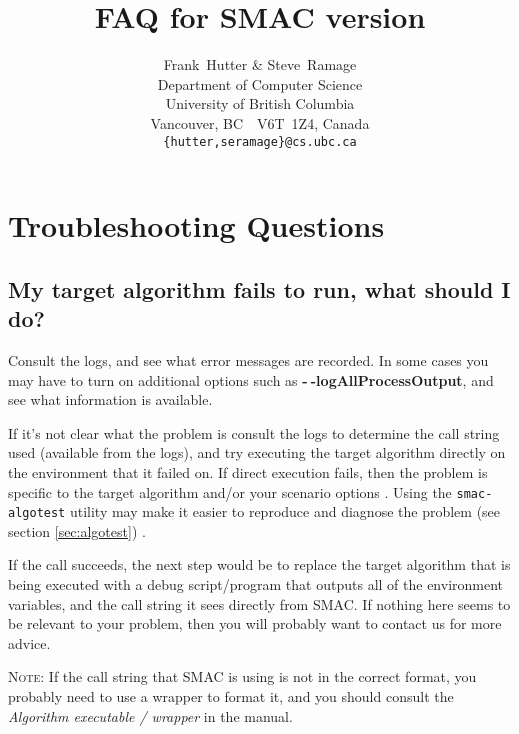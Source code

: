 \documentclass[11pt,letterpaper,oneside]{article}
\begin{document}
\title{FAQ for SMAC version }

\author{
Frank~Hutter \& Steve~Ramage\\
Department of Computer Science\\
University of British Columbia\\
Vancouver, BC\ \ V6T~1Z4, Canada\\
\texttt{\{hutter,seramage\}@cs.ubc.ca}
}



\maketitle


\renewcommand*\contentsname{FAQ}
\tableofcontents

\section{Troubleshooting Questions}


\subsection{My target algorithm fails to run, what should I do?}

Consult the logs, and see what error messages are recorded. In some cases you may have to turn on additional options such as \textbf{-$~\!$-logAllProcessOutput}, and see what information is available.

If it's not clear what the problem is consult the logs to determine the call string used (available from the logs), and try executing the target algorithm directly on the environment that it failed on. If direct execution fails, then the problem is specific to the target algorithm and/or your scenario options . Using the \texttt{smac-algotest} utility may make it easier to reproduce and diagnose the problem (see section \ref{sec:algotest}) .

If the call succeeds, the next step would be to replace the target algorithm that is being executed with a debug script/program that outputs all of the environment variables, and the call string it sees directly from SMAC. If nothing here seems to be relevant to your problem, then you will probably want to contact us for more advice.

\textsc{Note:} If the call string that SMAC is using is not in the correct format, you probably need to use a wrapper to format it, and you should consult the \emph{Algorithm executable / wrapper} in the manual.
\end{document}
